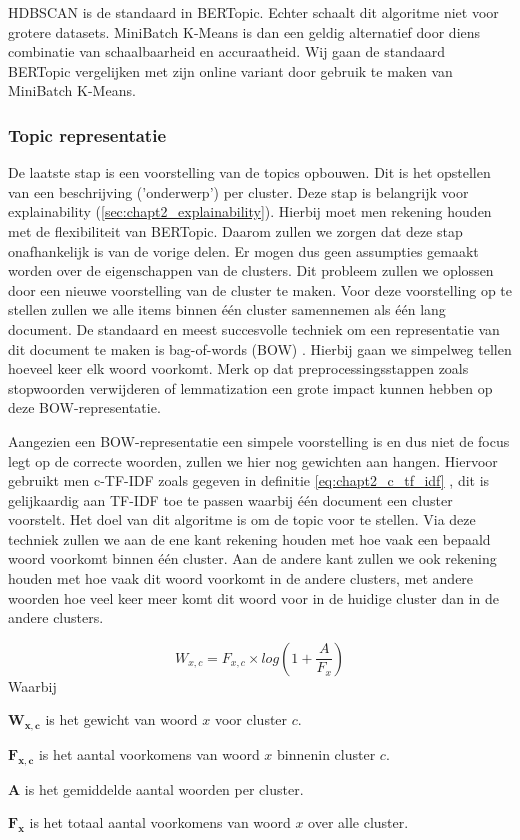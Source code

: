 HDBSCAN is de standaard in BERTopic. Echter schaalt dit algoritme niet voor grotere datasets. MiniBatch K-Means is dan een geldig alternatief door diens combinatie van schaalbaarheid en accuraatheid. Wij gaan de standaard BERTopic vergelijken met zijn online variant door gebruik te maken van MiniBatch K-Means.

\subsubsection{Topic representatie}
\label{sub:topic_representatie}
De laatste stap is een voorstelling van de topics opbouwen. Dit is het opstellen van een beschrijving ('onderwerp') per cluster. Deze stap is belangrijk voor explainability (\autoref{sec:chapt2_explainability}).  Hierbij moet men rekening houden met de flexibiliteit van BERTopic. Daarom zullen we zorgen dat deze stap onafhankelijk is van de vorige delen. Er mogen dus geen assumpties gemaakt worden over de eigenschappen van de clusters. Dit probleem zullen we oplossen door een nieuwe voorstelling van de cluster te maken. Voor deze voorstelling op te stellen zullen we alle items binnen één cluster samennemen als één lang document. De standaard en meest succesvolle techniek om een representatie van dit document te maken is bag-of-words (BOW) \cite{bag_of_words_blog}. Hierbij gaan we simpelweg tellen hoeveel keer elk woord voorkomt. Merk op dat preprocessingsstappen zoals stopwoorden verwijderen of lemmatization een grote impact kunnen hebben op deze BOW-representatie.

Aangezien een BOW-representatie een simpele voorstelling is en dus niet de focus legt op de correcte woorden, zullen we hier nog gewichten aan hangen. Hiervoor gebruikt men c-TF-IDF zoals gegeven in definitie \ref{eq:chapt2_c_tf_idf} \cite{bertopic_algo}, dit is gelijkaardig aan TF-IDF toe te passen waarbij één document een cluster voorstelt. Het doel van dit algoritme is om de topic voor te stellen. Via deze techniek zullen we aan de ene kant rekening houden met hoe vaak een bepaald woord voorkomt binnen één cluster. Aan de andere kant zullen we ook rekening houden met hoe vaak dit woord voorkomt in de andere clusters, met andere woorden hoe veel keer meer komt dit woord voor in de huidige cluster dan in de andere clusters.

\begin{equation}
    W_{x,c} = F_{x,c} \times log(1 + \frac{A}{F_x})
    \label{eq:chapt2_c_tf_idf}
\end{equation}
Waarbij
\begin{description}
    \item$\mathbf{W_{x,c}}$ is het gewicht van woord $x$ voor cluster $c$.
    \item$\mathbf{F_{x,c}}$ is het aantal voorkomens van woord $x$ binnenin cluster $c$.
    \item$\mathbf{A}$ is het gemiddelde aantal woorden per cluster.
    \item$\mathbf{F_{x}}$ is het totaal aantal voorkomens van woord $x$ over alle cluster.
\end{description}

